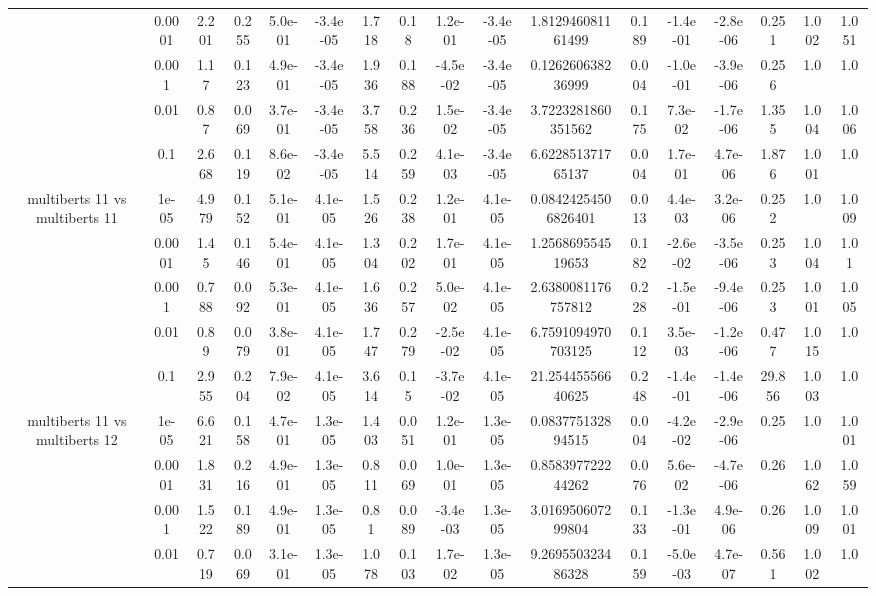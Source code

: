 \begin{tabular}{|c|c|c|c|c|c|c|c|c|c|c|c|c|c|c|c|c|}
 & 0.0001 & 2.201 & 0.255 & 5.0e-01 & -3.4e-05 & 1.718 & 0.18 & 1.2e-01 & -3.4e-05 & 1.812946081161499 & 0.189 & -1.4e-01 & -2.8e-06 & 0.251 & 1.002 & 1.051 \\
 & 0.001 & 1.17 & 0.123 & 4.9e-01 & -3.4e-05 & 1.936 & 0.188 & -4.5e-02 & -3.4e-05 & 0.126260638236999 & 0.004 & -1.0e-01 & -3.9e-06 & 0.256 & 1.0 & 1.0 \\
 & 0.01 & 0.87 & 0.069 & 3.7e-01 & -3.4e-05 & 3.758 & 0.236 & 1.5e-02 & -3.4e-05 & 3.7223281860351562 & 0.175 & 7.3e-02 & -1.7e-06 & 1.355 & 1.004 & 1.006 \\
 & 0.1 & 2.668 & 0.119 & 8.6e-02 & -3.4e-05 & 5.514 & 0.259 & 4.1e-03 & -3.4e-05 & 6.622851371765137 & 0.004 & 1.7e-01 & 4.7e-06 & 1.876 & 1.001 & 1.0 \\
\hline
\multirow{5}{*}{multiberts 11 vs multiberts 11} & 1e-05 & 4.979 & 0.152 & 5.1e-01 & 4.1e-05 & 1.526 & 0.238 & 1.2e-01 & 4.1e-05 & 0.08424254506826401 & 0.013 & 4.4e-03 & 3.2e-06 & 0.252 & 1.0 & 1.009 \\
 & 0.0001 & 1.45 & 0.146 & 5.4e-01 & 4.1e-05 & 1.304 & 0.202 & 1.7e-01 & 4.1e-05 & 1.256869554519653 & 0.182 & -2.6e-02 & -3.5e-06 & 0.253 & 1.004 & 1.01 \\
 & 0.001 & 0.788 & 0.092 & 5.3e-01 & 4.1e-05 & 1.636 & 0.257 & 5.0e-02 & 4.1e-05 & 2.6380081176757812 & 0.228 & -1.5e-01 & -9.4e-06 & 0.253 & 1.001 & 1.005 \\
 & 0.01 & 0.89 & 0.079 & 3.8e-01 & 4.1e-05 & 1.747 & 0.279 & -2.5e-02 & 4.1e-05 & 6.7591094970703125 & 0.112 & 3.5e-03 & -1.2e-06 & 0.477 & 1.015 & 1.0 \\
 & 0.1 & 2.955 & 0.204 & 7.9e-02 & 4.1e-05 & 3.614 & 0.15 & -3.7e-02 & 4.1e-05 & 21.25445556640625 & 0.248 & -1.4e-01 & -1.4e-06 & 29.856 & 1.003 & 1.0 \\
\hline
\multirow{5}{*}{multiberts 11 vs multiberts 12} & 1e-05 & 6.621 & 0.158 & 4.7e-01 & 1.3e-05 & 1.403 & 0.051 & 1.2e-01 & 1.3e-05 & 0.083775132894515 & 0.004 & -4.2e-02 & -2.9e-06 & 0.25 & 1.0 & 1.001 \\
 & 0.0001 & 1.831 & 0.216 & 4.9e-01 & 1.3e-05 & 0.811 & 0.069 & 1.0e-01 & 1.3e-05 & 0.858397722244262 & 0.076 & 5.6e-02 & -4.7e-06 & 0.26 & 1.062 & 1.059 \\
 & 0.001 & 1.522 & 0.189 & 4.9e-01 & 1.3e-05 & 0.81 & 0.089 & -3.4e-03 & 1.3e-05 & 3.016950607299804 & 0.133 & -1.3e-01 & 4.9e-06 & 0.26 & 1.009 & 1.001 \\
 & 0.01 & 0.719 & 0.069 & 3.1e-01 & 1.3e-05 & 1.078 & 0.103 & 1.7e-02 & 1.3e-05 & 9.269550323486328 & 0.159 & -5.0e-03 & 4.7e-07 & 0.561 & 1.002 & 1.0 \\

\end{tabular}
